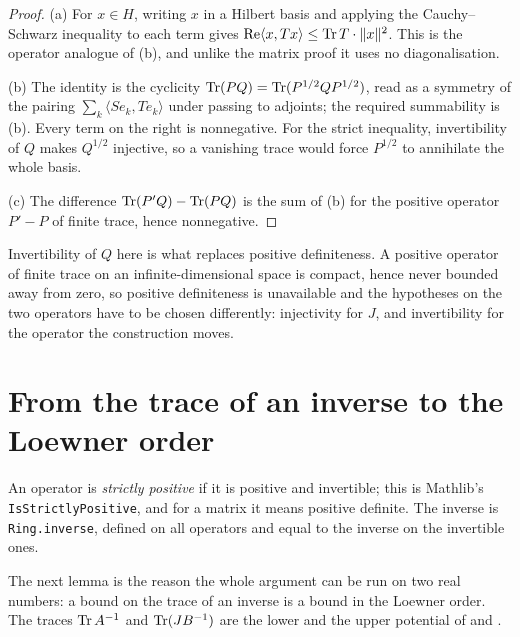 \begin{proof}
\leanok
{}
(a) For $x \in H$, writing $x$ in a Hilbert basis and applying the Cauchy--Schwarz
inequality to each term gives $\operatorname{Re} \langle x, T x \rangle \leq \operatorname{Tr} T \cdot \|x\|^2$. This
is the operator analogue of (b), and unlike the matrix proof
it uses no diagonalisation.

(b) The identity is the cyclicity $\operatorname{Tr} (PQ) = \operatorname{Tr} (P^{1/2} Q P^{1/2})$, read as a
symmetry of the pairing $\sum_k \langle S e_k, T e_k \rangle$ under passing to adjoints;
the required summability is (b). Every term on the
right is nonnegative. For the strict inequality, invertibility of $Q$ makes $Q^{1/2}$
injective, so a vanishing trace would force $P^{1/2}$ to annihilate the whole basis.

(c) The difference $\operatorname{Tr} (P' Q) - \operatorname{Tr} (P Q)$ is the sum of (b) for the positive operator
$P' - P$ of finite trace, hence nonnegative.
\end{proof}

Invertibility of $Q$ here is what replaces positive definiteness. A positive operator of
finite trace on an infinite-dimensional space is compact, hence never bounded away from
zero, so positive definiteness is unavailable and the hypotheses on the two operators
have to be chosen differently: injectivity for $J$, and invertibility for the operator
the construction moves.

\section{From the trace of an inverse to the Loewner order}

An operator is \emph{strictly positive} if it is positive and invertible; this is Mathlib's
\texttt{IsStrictlyPositive}, and for a matrix it means positive definite. The inverse is
\texttt{Ring.inverse}, defined on all operators and equal to the inverse on the invertible
ones.

The next lemma is the reason the whole argument can be run on two real numbers: a bound on
the trace of an inverse is a bound in the Loewner order. The traces $\operatorname{Tr} A^{-1}$ and
$\operatorname{Tr} (J B^{-1})$ are the lower and the upper potential of  and
.

